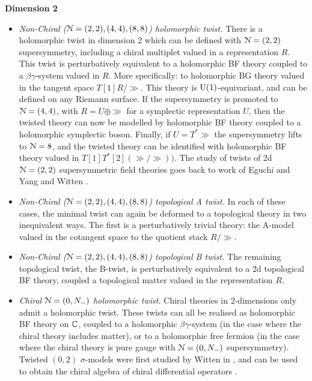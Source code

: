 \documentclass[10pt, oneside]{article}
\begin{document}
\textbf{Dimension 2}
\begin{itemize}
 \item \emph{Non-Chiral ($\mathcal{N}=(2,2), (4,4), (8,8)$) holomorphic twist.} There is a holomorphic twist in dimension 2 which can be defined with $\mathcal{N}=(2,2)$ supersymmetry, including a chiral multiplet valued in a representation $R$.  This twist is perturbatively equivalent to a holomorphic BF theory coupled to a $\beta \gamma$-system valued in $R$.  More specifically: to holomorphic BG theory valued in the tangent space $T[1]R/\gg$.  This theory is $\mathrm{U}(1)$-equivariant, and can be defined on any Riemann surface.  If the supersymmetry is promoted to $\mathcal{N}=(4,4)$, with $R = U \oplus \gg$ for a symplectic representation $U$, then the twisted theory can now be modelled by holomorphic BF theory coupled to a holomorphic symplectic boson.  Finally, if $U = T^*\gg$ the supersymmetry lifts to $\mathcal{N}=8$, and the twisted theory can be identified with holomorphic BF theory valued in $T[1]T^*[2](\gg/\gg))$.  The study of twists of 2d $\mathcal{N}=(2,2)$ supersymmetric field theories goes back to work of Eguchi and Yang \cite{EguchiYang} and Witten \cite{Wittenmirror}.
 \item \emph{Non-Chiral ($\mathcal{N}=(2,2), (4,4), (8,8)$) topological A twist.} In each of these cases, the minimal twist can again be deformed to a topological theory in two inequivalent ways.  The first is a perturbatively trivial theory: the A-model valued in the cotangent space to the quotient stack $R/\gg$.
 \item \emph{Non-Chiral ($\mathcal{N}=(2,2), (4,4), (8,8)$) topological B twist.} The remaining topological twist, the B-twist, is perturbatively equivalent to a 2d topological BF theory, coupled a topological matter valued in the representation $R$.
 \item \emph{Chiral $\mathcal{N}=(0,N_-)$ holomorphic twist.} Chiral theories in 2-dimensions only admit a holomorphic twist.  These twists can all be realised as holomorphic BF theory on $\mathbb C$, coupled to a holomorphic $\beta \gamma$-system (in the case where the chiral theory includes matter), or to a holomorphic free fermion (in the case where the chiral theory is pure gauge with $\mathcal{N}=(0,N_-)$ supersymmetry). Twisted $(0,2)$ $\sigma$-models were first studied by Witten in \cite{Wittenmirror}, and can be used to obtain the chiral algebra of chiral differential operators \cite{WittenCDO}. 
\end{itemize}
\end{document}
